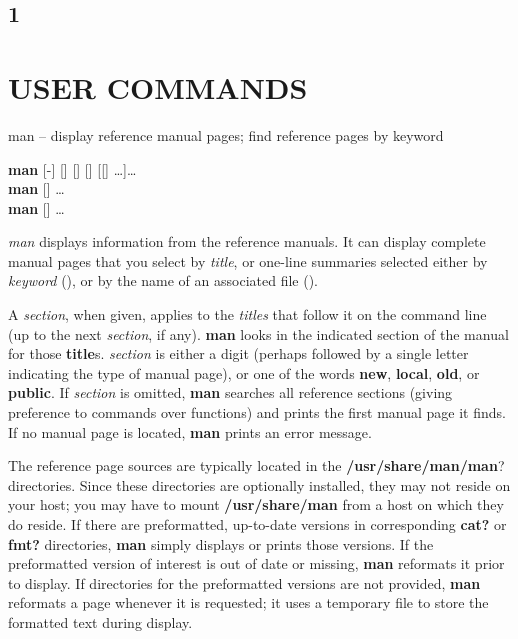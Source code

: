 \begin{manpage}
\section{1}\chapter{USER COMMANDS}
\begin{name}
man -- display reference manual pages; find reference pages by keyword
\end{name}
\begin{synopsis}
{\bf man} [-] [] []
  [] [[] 
  \ldots{}]\ldots{}\\ 
{\bf man} []  \ldots{}\\
{\bf man} []  \ldots{}
\end{synopsis}
\begin{description}
{\it man} displays information from the reference manuals.
It can display complete manual pages that you select by
{\it title}, or one-line summaries selected either by
{\it keyword} (),
or by the name of an associated file
().

A {\it section}, when given, applies to the
{\it titles} that follow it on the command line (up to the next
{\it section}, if any).
{\bf man} looks in the indicated section of the manual for those
{\bf title}s.  {\it section} is either a digit (perhaps followed by a
single letter indicating the type of manual page), or one of the words 
{\bf new}, {\bf local}, {\bf old}, or {\bf public}.
If {\it section} is omitted, {\bf man} searches all reference sections
(giving preference to commands over functions)
and prints the first manual page it finds.
If no manual page is located, {\bf man} prints an error message.

The reference page sources are typically located in the
{\bf /usr/share/man/man}? directories.  Since these directories are
optionally installed, they may not reside on your host; you may have
to mount  {\bf /usr/share/man} from a host on which they do reside. 
If there are preformatted, up-to-date versions in corresponding
{\bf cat?} or {\bf fmt?} directories, {\bf man}
simply displays or prints those versions.  If the preformatted
version of interest is out of date or missing, {\bf man}
reformats it prior to display.  If directories for the
preformatted versions are not provided,  {\bf man}
reformats a page whenever it is requested; it uses a temporary
file to store the formatted text during display.
 

\end{description}
\end{manpage}

